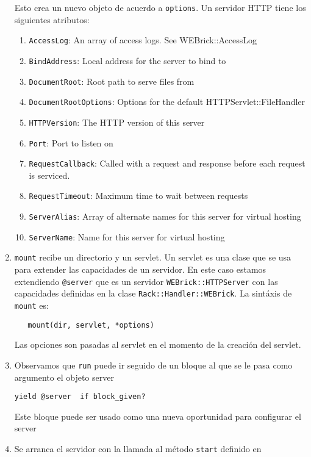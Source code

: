 \begin{enumerate}
Esto crea un nuevo objeto 
de acuerdo a \verb|options|.
Un servidor HTTP tiene los siguientes atributos:
\begin{enumerate}
\item \verb|AccessLog|: An array of access logs.  See WEBrick::AccessLog
\item \verb|BindAddress|: Local address for the server to bind to
\item \verb|DocumentRoot|: Root path to serve files from
\item \verb|DocumentRootOptions|: Options for the default HTTPServlet::FileHandler
\item \verb|HTTPVersion|: The HTTP version of this server
\item \verb|Port|: Port to listen on
\item \verb|RequestCallback|: Called with a request and response before each
       request is serviced.
\item \verb|RequestTimeout|: Maximum time to wait between requests
\item \verb|ServerAlias|: Array of alternate names for this server for virtual
               hosting
\item \verb|ServerName|: Name for this server for virtual hosting
\end{enumerate}
\item 
\verb|mount| recibe un directorio y un servlet. Un servlet es una
clase que se usa para extender las capacidades
de un servidor. En este caso estamos extendiendo \verb|@server| que
es un servidor \verb|WEBrick::HTTPServer|
con las capacidades definidas en la clase \verb|Rack::Handler::WEBrick|.
La sintáxis de \verb|mount| es:
\begin{verbatim}
   mount(dir, servlet, *options)
\end{verbatim}
Las opciones son pasadas al servlet en el momento de la creación
del servlet.
\item 
Observamos  que \verb|run| puede ir seguido de un bloque al que se le pasa como argumento
el objeto server
\begin{verbatim}
yield @server  if block_given?
\end{verbatim}
Este bloque puede ser usado como una nueva oportunidad para configurar el server
\item 
Se arranca el servidor con la llamada al método \verb|start| definido
en 
\end{enumerate}



